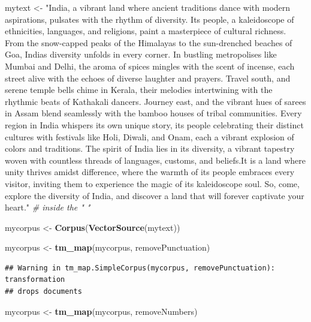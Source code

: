 \documentclass[
]{book}
\newenvironment{Shaded}{\begin{snugshade}}{\end{snugshade}}
\newcommand{\CommentTok}[1]{\textcolor[rgb]{0.56,0.35,0.01}{\textit{#1}}}
\newcommand{\FunctionTok}[1]{\textcolor[rgb]{0.13,0.29,0.53}{\textbf{#1}}}
\newcommand{\NormalTok}[1]{#1}
\newcommand{\OtherTok}[1]{\textcolor[rgb]{0.56,0.35,0.01}{#1}}
\newcommand{\StringTok}[1]{\textcolor[rgb]{0.31,0.60,0.02}{#1}}
\begin{document}
\begin{Shaded}
\begin{Highlighting}[]
\NormalTok{mytext }\OtherTok{\textless{}{-}} \StringTok{"India, a vibrant land where ancient traditions dance with modern aspirations, pulsates with the rhythm of diversity. Its people, a kaleidoscope of ethnicities, languages, and religions, paint a masterpiece of cultural richness. From the snow{-}capped peaks of the Himalayas to the sun{-}drenched beaches of Goa, India\textquotesingle{}s diversity unfolds in every corner. In bustling metropolises like Mumbai and Delhi, the aroma of spices mingles with the scent of incense, each street alive with the echoes of diverse laughter and prayers. Travel south, and serene temple bells chime in Kerala, their melodies intertwining with the rhythmic beats of Kathakali dancers. Journey east, and the vibrant hues of sarees in Assam blend seamlessly with the bamboo houses of tribal communities. Every region in India whispers its own unique story, its people celebrating their distinct cultures with festivals like Holi, Diwali, and Onam, each a vibrant explosion of colors and traditions. The spirit of India lies in its diversity, a vibrant tapestry woven with countless threads of languages, customs, and beliefs.It is a land where unity thrives amidst difference, where the warmth of its people embraces every visitor, inviting them to experience the magic of its kaleidoscope soul. So, come, explore the diversity of India, and discover a land that will forever captivate your heart."} \CommentTok{\# inside the " "}
\end{Highlighting}
\end{Shaded}

\begin{Shaded}
\begin{Highlighting}[]
\NormalTok{mycorpus }\OtherTok{\textless{}{-}} \FunctionTok{Corpus}\NormalTok{(}\FunctionTok{VectorSource}\NormalTok{(mytext))}

\NormalTok{mycorpus }\OtherTok{\textless{}{-}} \FunctionTok{tm\_map}\NormalTok{(mycorpus, removePunctuation)}
\end{Highlighting}
\end{Shaded}

\begin{verbatim}
## Warning in tm_map.SimpleCorpus(mycorpus, removePunctuation): transformation
## drops documents
\end{verbatim}

\begin{Shaded}
\begin{Highlighting}[]
\NormalTok{mycorpus }\OtherTok{\textless{}{-}} \FunctionTok{tm\_map}\NormalTok{(mycorpus, removeNumbers)}
\end{Highlighting}
\end{Shaded}
\end{document}
